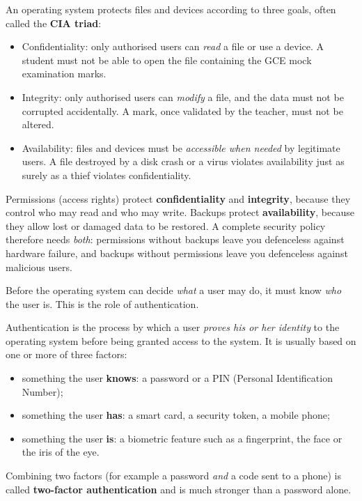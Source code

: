 \documentclass[11pt]{article}
\newcommand{\cle}[1]{{\popxbold\color{popdark}#1}}
\newcounter{popsec}
\newcounter{popsub}
\newcommand{\courssub}[1]{%
  \stepcounter{popsub}%
  \par\vspace{9pt}\noindent{\popxbold\fontsize{11.5}{13}\selectfont\color{popink}{\color{poporange}\thepopsec.\thepopsub}\hspace{6pt}#1}\par\nopagebreak\vspace{4pt}
}
\begin{document}
\begin{definition}
An operating system protects files and devices according to three goals, often called the \textbf{CIA triad}:
\begin{itemize}
\item \cle{Confidentiality}: only authorised users can \emph{read} a file or use a device. A student must not be able to open the file containing the GCE mock examination marks.
\item \cle{Integrity}: only authorised users can \emph{modify} a file, and the data must not be corrupted accidentally. A mark, once validated by the teacher, must not be altered.
\item \cle{Availability}: files and devices must be \emph{accessible when needed} by legitimate users. A file destroyed by a disk crash or a virus violates availability just as surely as a thief violates confidentiality.
\end{itemize}
\end{definition}

\begin{propriete}
\cle{Permissions} (access rights) protect \textbf{confidentiality} and \textbf{integrity}, because they control who may read and who may write. \cle{Backups} protect \textbf{availability}, because they allow lost or damaged data to be restored. A complete security policy therefore needs \emph{both}: permissions without backups leave you defenceless against hardware failure, and backups without permissions leave you defenceless against malicious users.
\end{propriete}

\courssub{Authentication: Proving Who You Are}

Before the operating system can decide \emph{what} a user may do, it must know \emph{who} the user is. This is the role of authentication.

\begin{definition}[Authentication]
\cle{Authentication} is the process by which a user \emph{proves his or her identity} to the operating system before being granted access to the system. It is usually based on one or more of three factors:
\begin{itemize}
\item something the user \textbf{knows}: a \cle{password} or a \cle{PIN} (Personal Identification Number);
\item something the user \textbf{has}: a smart card, a security token, a mobile phone;
\item something the user \textbf{is}: a \cle{biometric} feature such as a fingerprint, the face or the iris of the eye.
\end{itemize}
Combining two factors (for example a password \emph{and} a code sent to a phone) is called \textbf{two-factor authentication} and is much stronger than a password alone.
\end{definition}
\end{document}
